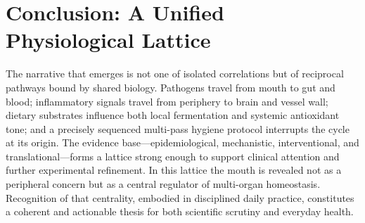 \documentclass[11pt,a4paper]{article}
\begin{document}
\section{Conclusion: A Unified Physiological Lattice}
The narrative that emerges is not one of isolated correlations but of reciprocal pathways bound by shared biology. Pathogens travel from mouth to gut and blood; inflammatory signals travel from periphery to brain and vessel wall; dietary substrates influence both local fermentation and systemic antioxidant tone; and a precisely sequenced multi-pass hygiene protocol interrupts the cycle at its origin. The evidence base---epidemiological, mechanistic, interventional, and translational---forms a lattice strong enough to support clinical attention and further experimental refinement. In this lattice the mouth is revealed not as a peripheral concern but as a central regulator of multi-organ homeostasis. Recognition of that centrality, embodied in disciplined daily practice, constitutes a coherent and actionable thesis for both scientific scrutiny and everyday health.
\end{document}

